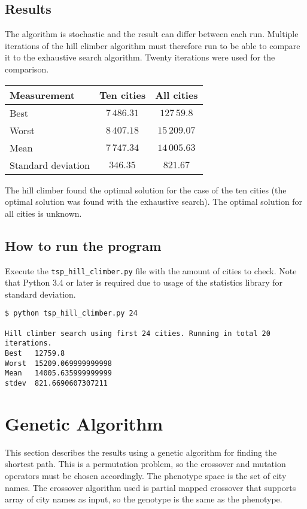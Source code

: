\documentclass{article}
\begin{document}
\subsection*{Results}

The algorithm is stochastic and the result can differ between each run. Multiple iterations of the hill climber algorithm must therefore run to be able to compare it to the exhaustive search algorithm. Twenty iterations were used for the comparison.

\begin{center}
\begin{tabular}{lcc}
\toprule
Measurement & Ten cities & All cities \\
\midrule
Best & $7\,486.31$ & $127\,59.8$ \\
Worst & $8\,407.18$ & $15\,209.07$ \\
Mean & $7\,747.34$ & $14\,005.63$ \\
Standard deviation & $346.35$ & $821.67$ \\
\bottomrule
\end{tabular}
\end{center}

The hill climber found the optimal solution for the case of the ten cities (the optimal solution was found with the exhaustive search). The optimal solution for all cities is unknown.

\subsection*{How to run the program}

Execute the \texttt{tsp\_hill\_climber.py} file with the amount of cities to check. Note that Python 3.4 or later is required due to usage of the statistics library for standard deviation.

\begin{verbatim}
$ python tsp_hill_climber.py 24

Hill climber search using first 24 cities. Running in total 20
iterations.
Best   12759.8
Worst  15209.069999999998
Mean   14005.635999999999
stdev  821.6690607307211
\end{verbatim}


\section*{Genetic Algorithm}

This section describes the results using a genetic algorithm for finding the shortest path. This is a permutation problem, so the crossover and mutation operators must be chosen accordingly. The phenotype space is the set of city names. The crossover algorithm used is partial mapped crossover that supports array of city names as input, so the genotype is the same as the phenotype.
\end{document}
